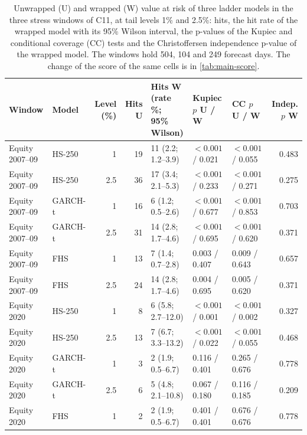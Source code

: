 \begin{table}[htbp]
\centering
\small
\caption{Unwrapped (U) and wrapped (W) value at risk of three ladder models in the three stress windows of C11, at tail levels 1\% and 2.5\%: hits, the hit rate of the wrapped model with its 95\% Wilson interval, the p-values of the Kupiec and conditional coverage (CC) tests and the Christoffersen independence p-value of the wrapped model. The windows hold 504, 104 and 249 forecast days. The change of the score of the same cells is in \cref{tab:main-score}.}
\label{tab:main-results}
{\footnotesize\setlength{\tabcolsep}{4pt}
\begin{adjustbox}{max width=\textwidth}
\begin{tabular}{llrrlllr}
\toprule
Window & Model & Level (\%) & Hits U & \makecell[bl]{Hits W \\ (rate \%; \\ 95\% Wilson)} & \makecell[bl]{Kupiec $p$ \\ U / W} & CC $p$ U / W & Indep. $p$ W \\
\midrule
Equity 2007--09 & HS-250 & 1 & 19 & 11 (2.2; 1.2--3.9) & $<0.001$ / 0.021 & $<0.001$ / 0.055 & 0.483 \\
Equity 2007--09 & HS-250 & 2.5 & 36 & 17 (3.4; 2.1--5.3) & $<0.001$ / 0.233 & $<0.001$ / 0.271 & 0.275 \\
Equity 2007--09 & GARCH-t & 1 & 16 & 6 (1.2; 0.5--2.6) & $<0.001$ / 0.677 & $<0.001$ / 0.853 & 0.703 \\
Equity 2007--09 & GARCH-t & 2.5 & 31 & 14 (2.8; 1.7--4.6) & $<0.001$ / 0.695 & $<0.001$ / 0.620 & 0.371 \\
Equity 2007--09 & FHS & 1 & 13 & 7 (1.4; 0.7--2.8) & 0.003 / 0.407 & 0.009 / 0.643 & 0.657 \\
Equity 2007--09 & FHS & 2.5 & 24 & 14 (2.8; 1.7--4.6) & 0.004 / 0.695 & 0.005 / 0.620 & 0.371 \\
Equity 2020 & HS-250 & 1 & 8 & 6 (5.8; 2.7--12.0) & $<0.001$ / 0.001 & $<0.001$ / 0.002 & 0.327 \\
Equity 2020 & HS-250 & 2.5 & 13 & 7 (6.7; 3.3--13.2) & $<0.001$ / 0.022 & $<0.001$ / 0.055 & 0.468 \\
Equity 2020 & GARCH-t & 1 & 3 & 2 (1.9; 0.5--6.7) & 0.116 / 0.401 & 0.265 / 0.676 & 0.778 \\
Equity 2020 & GARCH-t & 2.5 & 6 & 5 (4.8; 2.1--10.8) & 0.067 / 0.180 & 0.116 / 0.185 & 0.209 \\
Equity 2020 & FHS & 1 & 2 & 2 (1.9; 0.5--6.7) & 0.401 / 0.401 & 0.676 / 0.676 & 0.778 \\

\end{tabular}
\end{adjustbox}}
\end{table}
